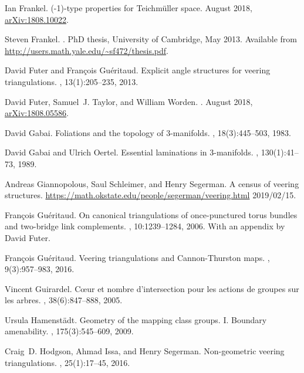 \documentclass[12pt]{amsart}
\begin{document}
\begin{thebibliography}{10}
Ian {Frankel}.
(-1)-type properties for {Teichm\"u}ller space.
\newblock August 2018,
  \href{http://arxiv.org/abs/1808.10022}{{arXiv:1808.10022}}.

Steven Frankel.
.
\newblock PhD thesis, University of Cambridge, May 2013.
\newblock Available from \url{http://users.math.yale.edu/~sf472/thesis.pdf}.

David Futer and Fran\c{c}ois Gu\'{e}ritaud.
\newblock Explicit angle structures for veering triangulations.
, 13(1):205--235, 2013.

David {Futer}, Samuel~J. {Taylor}, and William {Worden}.
.
\newblock August 2018,
  \href{http://arxiv.org/abs/1808.05586}{{arXiv:1808.05586}}.

David Gabai.
\newblock Foliations and the topology of {$3$}-manifolds.
, 18(3):445--503, 1983.

David Gabai and Ulrich Oertel.
\newblock Essential laminations in {$3$}-manifolds.
, 130(1):41--73, 1989.

Andreas Giannopolous, Saul Schleimer, and Henry Segerman.
\newblock A census of veering structures.
\newblock \url{https://math.okstate.edu/people/segerman/veering.html}
  {2019/02/15}.

Fran\c{c}ois Gu\'{e}ritaud.
\newblock On canonical triangulations of once-punctured torus bundles and
  two-bridge link complements.
, 10:1239--1284, 2006.
\newblock With an appendix by David Futer.

Fran\c{c}ois Gu\'{e}ritaud.
\newblock Veering triangulations and {C}annon-{T}hurston maps.
, 9(3):957--983, 2016.

Vincent Guirardel.
\newblock C\oe ur et nombre d'intersection pour les actions de groupes sur les
  arbres.
, 38(6):847--888, 2005.

Ursula Hamenst\"{a}dt.
\newblock Geometry of the mapping class groups. {I}. {B}oundary amenability.
, 175(3):545--609, 2009.

Craig~D. Hodgson, Ahmad Issa, and Henry Segerman.
\newblock Non-geometric veering triangulations.
, 25(1):17--45, 2016.


\end{thebibliography}
\end{document}
